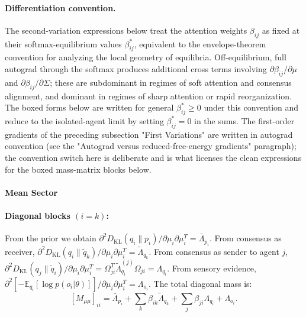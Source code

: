 \documentclass[11pt]{article}
\begin{document}
\paragraph{Differentiation convention.}
The second-variation expressions below treat the attention weights $\beta_{ij}$ as fixed at their softmax-equilibrium values $\beta_{ij}^*$, equivalent to the envelope-theorem convention for analyzing the local geometry of equilibria. Off-equilibrium, full autograd through the softmax produces additional cross terms involving $\partial \beta_{ij}/\partial \mu$ and $\partial \beta_{ij}/\partial \Sigma$; these are subdominant in regimes of soft attention and consensus alignment, and dominant in regimes of sharp attention or rapid reorganization. The boxed forms below are written for general $\beta_{ij}^* \geq 0$ under this convention and reduce to the isolated-agent limit by setting $\beta_{ij}^* = 0$ in the sums. The first-order gradients of the preceding subsection "First Variations" are written in autograd convention (see the "Autograd versus reduced-free-energy gradients" paragraph); the convention switch here is deliberate and is what licenses the clean expressions for the boxed mass-matrix blocks below.

\paragraph{Mean Sector}

\paragraph{Diagonal blocks $(i = k)$:} From the prior we obtain $\partial^2 D_{\mathrm{KL}}(q_i \| p_i)/\partial \mu_i \partial \mu_i^T = \bar{\Lambda}_{p_i}$. From consensus as receiver, $\partial^2 D_{\mathrm{KL}}(q_i \| \tilde{q}_k)/\partial \mu_i \partial \mu_i^T = \tilde{\Lambda}_{q_k}$. From consensus as sender to agent $j$, $\partial^2 D_{\mathrm{KL}}(q_j \| \tilde{q}_i)/\partial \mu_i \partial \mu_i^T = \Omega_{ji}^T \tilde{\Lambda}_{q_i}^{(j)} \Omega_{ji} = \Lambda_{q_i}$. From sensory evidence, $\partial^2[-\mathbb{E}_{q_i}[\log p(o_i | \theta)]]/\partial \mu_i \partial \mu_i^T = \Lambda_{o_i}$. The total diagonal mass is:
\begin{equation}
\boxed{[M_{\mu\mu}]_{ii} = \bar{\Lambda}_{p_i} + \sum_k \beta_{ik} \tilde{\Lambda}_{q_k} + \sum_j \beta_{ji} \Lambda_{q_i} + \Lambda_{o_i}.}
\label{eq:mass_mu_diagonal}
\end{equation}
\end{document}

